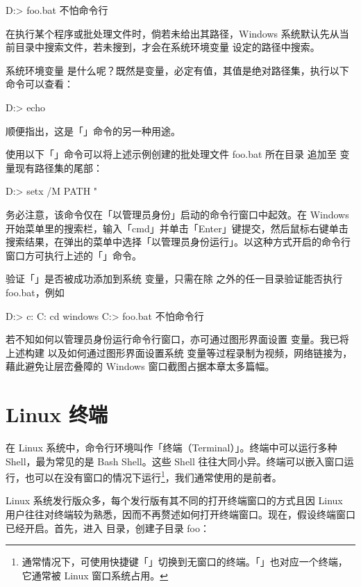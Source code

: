 {{{{\starttyping
D:\foo> foo.bat
不怕命令行
\stoptyping

\noindent 在执行某个程序或批处理文件时，倘若未给出其路径，Windows 系统默认先从当前目录中搜索文件，若未搜到，才会在系统环境变量  设定的路径中搜索。

系统环境变量  是什么呢？既然是变量，必定有值，其值是绝对路径集，执行以下命令可以查看：

\starttyping
D:\foo> echo %
\stoptyping

\noindent 顺便指出，这是「」命令的另一种用途。

使用以下「」命令可以将上述示例创建的批处理文件 foo.bat 所在目录  追加至  变量现有路径集的尾部：

\starttyping
D:\foo> setx /M PATH "%
\stoptyping

\noindent 务必注意，该命令仅在「以管理员身份」启动的命令行窗口中起效。在 Windows 开始菜单里的搜索栏，输入「cmd」并单击「Enter」键提交，然后鼠标右键单击搜索结果，在弹出的菜单中选择「以管理员身份运行」。以这种方式开启的命令行窗口方可执行上述的「」命令。

验证「」是否被成功添加到系统  变量，只需在除  之外的任一目录验证能否执行 foo.bat，例如

\starttyping
D:\foo> c:
C:\> cd windows  
C:\Windows{}> foo.bat
不怕命令行  
\stoptyping

若不知如何以管理员身份运行命令行窗口，亦可通过图形界面设置  变量。我已将上述构建  以及如何通过图形界面设置系统  变量等过程录制为视频，网络链接为，藉此避免让层峦叠障的 Windows 窗口截图占据本章太多篇幅。

\section{Linux 终端}

在 Linux 系统中，命令行环境叫作「终端（Terminal）」。终端中可以运行多种 Shell，最为常见的是 Bash Shell。这些 Shell 往往大同小异。终端可以嵌入窗口运行，也可以在没有窗口的情况下运行\footnote{通常情况下，可使用快捷键「」切换到无窗口的终端。「」也对应一个终端，它通常被 Linux 窗口系统占用。}，我们通常使用的是前者。

Linux 系统发行版众多，每个发行版有其不同的打开终端窗口的方式且因 Linux 用户往往对终端较为熟悉，因而不再赘述如何打开终端窗口。现在，假设终端窗口已经开启。首先，进入  目录，创建子目录 foo：

}}}}
